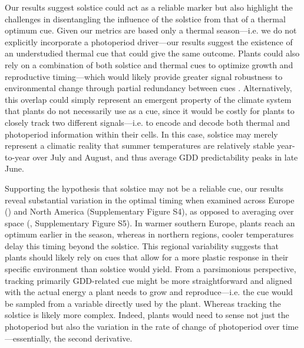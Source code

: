 \documentclass[11pt,letter]{article}
\begin{document}
Our results suggest solstice could act as a reliable marker but also highlight the challenges in disentangling the influence of the solstice from that of a thermal optimum cue. Given our metrics are based only a thermal season---i.e. we do not explicitly incorporate a photoperiod driver---our results suggest the existence of an understudied thermal cue that could give the same outcome.
Plants could also rely on a combination of both solstice and thermal cues to optimize growth and reproductive timing---which would likely provide greater signal robustness to environmental change through partial redundancy between cues \citep{Bonamour2019}.
Alternatively, this overlap could simply represent an emergent property of the climate system that plants do not necessarily use as a cue, since it would be costly for plants to closely track two different signals---i.e. to encode and decode both thermal and photoperiod information within their cells. In this case, solstice may merely represent a climatic reality that summer temperatures are relatively stable year-to-year over July and August, and thus average GDD predictability peaks in late June. 

Supporting the hypothesis that solstice may not be a reliable cue, our results reveal substantial variation in the optimal timing when examined across Europe () and North America (Supplementary Figure S4), as opposed to averaging over space (, Supplementary Figure S5). In warmer southern Europe, plants reach an optimum earlier in the season, whereas in northern regions, cooler temperatures delay this timing beyond the solstice. This regional variability suggests that plants should likely rely on cues that allow for a more plastic response in their specific environment than solstice would yield. From a parsimonious perspective, tracking primarily GDD-related cue might be more straightforward and aligned with the actual energy a plant needs to grow and reproduce---i.e. the cue would be sampled from a variable directly used by the plant.
Whereas tracking the solstice is likely more complex. Indeed, plants would need to sense not just the photoperiod but also the variation in the rate of change of photoperiod over time---essentially, the second derivative.
\end{document}
